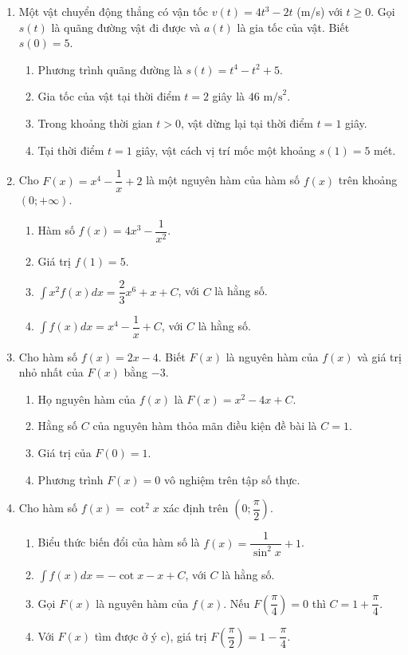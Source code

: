 \documentclass[12pt]{article}
\begin{document}
\begin{enumerate}[label=\textbf{Câu \arabic*.}, start=1]
		\item Một vật chuyển động thẳng có vận tốc $v(t) = 4t^3 - 2t$ (m/s) với $t \ge 0$. Gọi $s(t)$ là quãng đường vật đi được và $a(t)$ là gia tốc của vật. Biết $s(0) = 5$.
		\begin{enumerate}[label=\alph*)]
			\item Phương trình quãng đường là $s(t) = t^4 - t^2 + 5$.
			\item Gia tốc của vật tại thời điểm $t = 2$ giây là $46 \text{ m/s}^2$.
			\item Trong khoảng thời gian $t > 0$, vật dừng lại tại thời điểm $t = 1$ giây.
			\item Tại thời điểm $t = 1$ giây, vật cách vị trí mốc một khoảng $s(1) = 5$ mét.
		\end{enumerate}
		
		\item Cho $F(x) = x^4 - \dfrac{1}{x} + 2$ là một nguyên hàm của hàm số $f(x)$ trên khoảng $(0; +\infty)$.
		\begin{enumerate}[label=\alph*)]
			\item Hàm số $f(x) = 4x^3 - \dfrac{1}{x^2}$.
			\item Giá trị $f(1) = 5$.
			\item $\displaystyle \int x^2 f(x) dx = \dfrac{2}{3}x^6 + x + C$, với $C$ là hằng số.
			\item $\displaystyle \int f(x) dx = x^4 - \dfrac{1}{x} + C$, với $C$ là hằng số.
		\end{enumerate}
		
		\item Cho hàm số $f(x) = 2x - 4$. Biết $F(x)$ là nguyên hàm của $f(x)$ và giá trị nhỏ nhất của $F(x)$ bằng $-3$.
		\begin{enumerate}[label=\alph*)]
			\item Họ nguyên hàm của $f(x)$ là $F(x) = x^2 - 4x + C$.
			\item Hằng số $C$ của nguyên hàm thỏa mãn điều kiện đề bài là $C = 1$.
			\item Giá trị của $F(0) = 1$.
			\item Phương trình $F(x) = 0$ vô nghiệm trên tập số thực.
		\end{enumerate}
		
		\item Cho hàm số $f(x) = \cot^2 x$ xác định trên $\left(0; \dfrac{\pi}{2}\right)$.
		\begin{enumerate}[label=\alph*)]
			\item Biểu thức biến đổi của hàm số là $f(x) = \dfrac{1}{\sin^2 x} + 1$.
			\item $\displaystyle \int f(x) dx = -\cot x - x + C$, với $C$ là hằng số.
			\item Gọi $F(x)$ là nguyên hàm của $f(x)$. Nếu $F\left(\dfrac{\pi}{4}\right) = 0$ thì $C = 1 + \dfrac{\pi}{4}$.
			\item Với $F(x)$ tìm được ở ý c), giá trị $F\left(\dfrac{\pi}{2}\right) = 1 - \dfrac{\pi}{4}$.
		\end{enumerate}
		

\end{enumerate}
\end{document}
